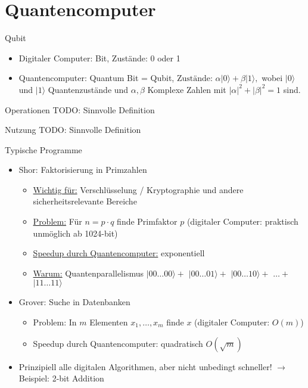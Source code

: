 \section{Quantencomputer}

\begin{defi}[Quantencomputer]{Qubit}
    \begin{itemize}
        \item Digitaler Computer: Bit, Zustände: 0 oder 1
        \item Quantencomputer: Quantum Bit = Qubit,
              $\text{Zustände: } \alpha|0\rangle + \beta|1\rangle,$
              wobei $|0\rangle$ und $|1\rangle$ Quantenzustände und
              $\alpha, \beta$ Komplexe Zahlen mit $|\alpha|^2 + |\beta|^2 = 1$ sind.
    \end{itemize}
\end{defi}

\begin{defi}[Quantencomputer]{Operationen}
    TODO: Sinnvolle Definition
\end{defi}

\begin{defi}[Quantencomputer]{Nutzung}
    TODO: Sinnvolle Definition
\end{defi}

\begin{defi}[Quantencomputer]{Typische Programme}
    \begin{itemize}
        \item Shor: Faktorisierung in Primzahlen
              \begin{itemize}
                  \item \underline{Wichtig für:} Verschlüsselung / Kryptographie und andere sicherheitsrelevante Bereiche
                  \item \underline{Problem:} Für $n=p\cdot q$ finde Primfaktor $p$
                        (digitaler Computer: praktisch unmöglich ab 1024-bit)
                  \item \underline{Speedup durch Quantencomputer:} exponentiell
                  \item \underline{Warum:} Quantenparallelismus $|00\ldots00\rangle+$ $|00\ldots01\rangle+$ $|00\ldots10\rangle+$ $\ldots+$ $|11\ldots11\rangle$
              \end{itemize}
        \item Grover: Suche in Datenbanken
              \begin{itemize}
                  \item Problem: In $m$ Elementen $x_1, \ldots, x_m$ finde $x$ (digitaler Computer: $O(m)$)
                  \item Speedup durch Quantencomputer: quadratisch $O(\sqrt{m})$
              \end{itemize}
        \item Prinzipiell alle digitalen Algorithmen, aber nicht unbedingt schneller! $\to$ Beispiel: 2-bit Addition
    \end{itemize}
\end{defi}

